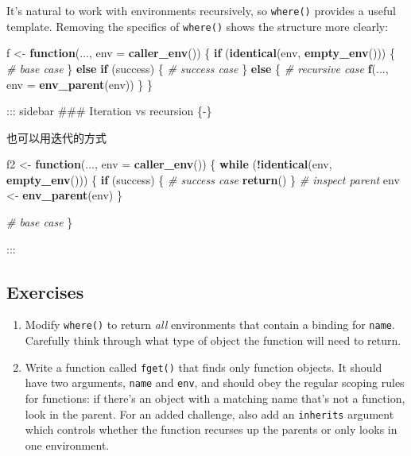 \documentclass[]{book}
\newenvironment{Shaded}{\begin{snugshade}}{\end{snugshade}}
\newcommand{\KeywordTok}[1]{\textcolor[rgb]{0.13,0.29,0.53}{\textbf{#1}}}
\newcommand{\DataTypeTok}[1]{\textcolor[rgb]{0.13,0.29,0.53}{#1}}
\newcommand{\StringTok}[1]{\textcolor[rgb]{0.31,0.60,0.02}{#1}}
\newcommand{\CommentTok}[1]{\textcolor[rgb]{0.56,0.35,0.01}{\textit{#1}}}
\newcommand{\ControlFlowTok}[1]{\textcolor[rgb]{0.13,0.29,0.53}{\textbf{#1}}}
\newcommand{\OperatorTok}[1]{\textcolor[rgb]{0.81,0.36,0.00}{\textbf{#1}}}
\newcommand{\NormalTok}[1]{#1}
\theoremstyle{definition}
\theoremstyle{definition}
\theoremstyle{definition}
\theoremstyle{remark}
\begin{document}
It's natural to work with environments recursively, so \texttt{where()}
provides a useful template. Removing the specifics of \texttt{where()}
shows the structure more clearly:

\begin{Shaded}
\begin{Highlighting}[]
\NormalTok{f <-}\StringTok{ }\ControlFlowTok{function}\NormalTok{(..., }\DataTypeTok{env =} \KeywordTok{caller_env}\NormalTok{()) \{}
  \ControlFlowTok{if}\NormalTok{ (}\KeywordTok{identical}\NormalTok{(env, }\KeywordTok{empty_env}\NormalTok{())) \{}
    \CommentTok{# base case}
\NormalTok{  \} }\ControlFlowTok{else} \ControlFlowTok{if}\NormalTok{ (success) \{}
    \CommentTok{# success case}
\NormalTok{  \} }\ControlFlowTok{else}\NormalTok{ \{}
    \CommentTok{# recursive case}
    \KeywordTok{f}\NormalTok{(..., }\DataTypeTok{env =} \KeywordTok{env_parent}\NormalTok{(env))}
\NormalTok{  \}}
\NormalTok{\}}
\end{Highlighting}
\end{Shaded}

::: sidebar \#\#\# Iteration vs recursion \{-\}

也可以用迭代的方式

\begin{Shaded}
\begin{Highlighting}[]
\NormalTok{f2 <-}\StringTok{ }\ControlFlowTok{function}\NormalTok{(..., }\DataTypeTok{env =} \KeywordTok{caller_env}\NormalTok{()) \{}
  \ControlFlowTok{while}\NormalTok{ (}\OperatorTok{!}\KeywordTok{identical}\NormalTok{(env, }\KeywordTok{empty_env}\NormalTok{())) \{}
    \ControlFlowTok{if}\NormalTok{ (success) \{}
      \CommentTok{# success case}
      \KeywordTok{return}\NormalTok{()}
\NormalTok{    \}}
    \CommentTok{# inspect parent}
\NormalTok{    env <-}\StringTok{ }\KeywordTok{env_parent}\NormalTok{(env)}
\NormalTok{  \}}

  \CommentTok{# base case}
\NormalTok{\}}
\end{Highlighting}
\end{Shaded}

:::

\subsection{Exercises}\label{exercises-7}

\begin{enumerate}
\def\labelenumi{\arabic{enumi}.}
\item
  Modify \texttt{where()} to return \emph{all} environments that contain
  a binding for \texttt{name}. Carefully think through what type of
  object the function will need to return.
\item
  Write a function called \texttt{fget()} that finds only function
  objects. It should have two arguments, \texttt{name} and \texttt{env},
  and should obey the regular scoping rules for functions: if there's an
  object with a matching name that's not a function, look in the parent.
  For an added challenge, also add an \texttt{inherits} argument which
  controls whether the function recurses up the parents or only looks in
  one environment.
\end{enumerate}
\end{document}
